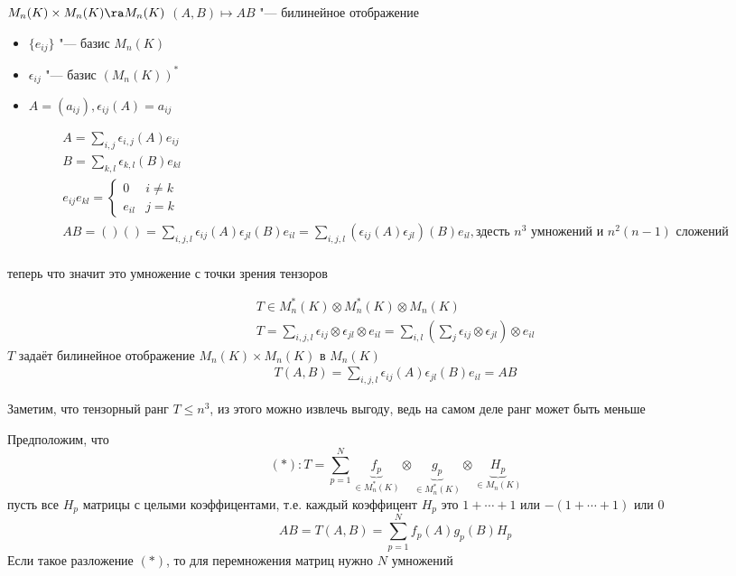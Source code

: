 $ M_n(K) \times M_n(K) \ra M_n(K)$
$ (A, B) \mapsto AB$ "--- билинейное отображение

\begin{itemize}
    \item $\{e_{ij}\}$ "--- базис $M_n(K)$
    \item $\epsilon_{ij}$ "--- базис $(M_n(K))^*$
    \item $A = (a_{ij}), \epsilon_{ij}(A) = a_{ij}$
\end{itemize}

\begin{gather*}
    A = \sum_{i,j} \epsilon_{i,j}(A)e_{ij} \\
    B = \sum_{k,l} \epsilon_{k,l}(B)e_{kl} \\
    e_{ij}e_{kl} = \left\{
    \begin{matrix} 
    0 & i \neq k \\
    e_{il} & j = k
    \end{matrix}
    \right. \\
    AB = ()() = \sum_{i,j,l} \epsilon_{ij}(A)\epsilon_{jl}(B)e_{il} = 
    \sum_{i,j,l} \left(\epsilon_{ij}(A) \epsilon_{jl}\right)(B)e_{il}, 
    \text{здесть $n^3$ умножений и $n^2(n-1)$ сложений} \\
\end{gather*}

теперь что значит это умножение с точки зрения тензоров

\begin{gather*}
    T \in M^*_n(K) \otimes M^*_n(K) \otimes M_n(K) \\
    T = \sum_{i,j,l} \epsilon_{ij} \otimes \epsilon_{jl} \otimes e_{il} = 
        \sum_{i,l} (\sum_{j} \epsilon_{ij} \otimes \epsilon_{jl}) \otimes e_{il}
\end{gather*}
$T$ задаёт билинейное отображение $M_n(K)\times M_n(K)$ в $M_n(K)$
\begin{gather*}
    T(A, B) = \sum_{i,j,l} \epsilon_{ij}(A) \epsilon_{jl}(B) e_{il} = AB
\end{gather*}

Заметим, что тензорный ранг $T \leq n^3$, из этого можно извлечь выгоду, ведь на самом деле
ранг может быть меньше

Предположим, что 
$$(*): T = \sum^N_{p=1}    \underbrace{f_p}_{\in M_n^*(K)} \otimes 
                    \underbrace{g_p}_{\in M_n^*(K)} \otimes
                    \underbrace{H_p}_{\in M_n(K)} $$
пусть все $H_p$ матрицы с целыми коэффицентами, т.е. каждый коэффицент $H_p$ это $1 + \cdots + 1$ или $-(1 + \cdots + 1)$ или $0$
$$ AB = T(A, B) = \sum_{p=1}^N f_p(A)g_p(B)H_p $$
Если такое разложение $(*)$, то для перемножения матриц нужно $N$ умножений

